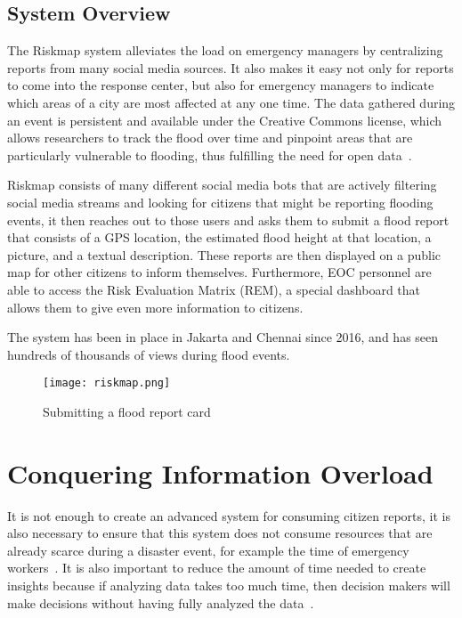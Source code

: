 	\subsection{System Overview}
	The Riskmap system alleviates the load on emergency managers by
	centralizing reports from many social media sources. It also makes it
	easy not only for reports to come into the response center, but also for
	emergency managers to indicate which areas of a city are most affected
	at any one time. The data gathered during an event is persistent and
	available under the Creative Commons license, which allows researchers
	to track the flood over time and pinpoint areas that are particularly
	vulnerable to flooding, thus fulfilling the need for open data~\cite{holdernessSocialMediaGeoSocial2015a}.

	Riskmap consists of many different social media bots that are actively
	filtering social media streams and looking for citizens that might be
	reporting flooding events, it then reaches out to those users and asks
	them to submit a flood report that consists of a GPS location, the
	estimated flood height at that location, a picture, and a textual
	description. These reports are then displayed on a public map for other
	citizens to inform themselves. Furthermore, EOC personnel are able to
	access the Risk Evaluation Matrix (REM), a special dashboard that allows
	them to give even more information to citizens.

	The system has been in place in Jakarta and Chennai since 2016, and has seen
	hundreds of thousands of views during flood events.

	\begin{figure}
		\texttt{[image: riskmap.png]}
		\caption{Submitting a flood report card}\label{fig:cards}
	\end{figure}

\section{Conquering Information Overload}
	It is not enough to create an advanced system for consuming citizen
	reports, it is also necessary to ensure that this system does not
	consume resources that are already scarce during a disaster event, for
	example the time of emergency
	workers~\cite{aminDataNaturalDisasters2008}. It is also important to
	reduce the amount of time needed to create insights because if analyzing
	data takes too much time, then decision makers will make decisions
	without having fully analyzed the
	data~\cite{quarantelliUrbanVulnerabilityDisasters2003}.

